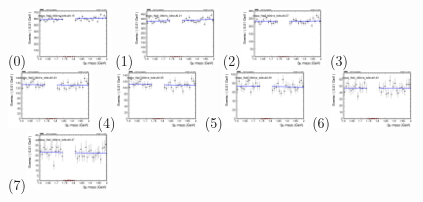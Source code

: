 \begin{figure}[h!]
        \centering
        \subfigure(0){\includegraphics[width=0.2\textwidth]{unfixed_exp/plots/all/massfit_all_40bins_bdtcut0.15.png}}
        \subfigure(1){\includegraphics[width=0.2\textwidth]{unfixed_exp/plots/all/massfit_all_40bins_bdtcut0.21.png}}
        \subfigure(2){\includegraphics[width=0.2\textwidth]{unfixed_exp/plots/all/massfit_all_40bins_bdtcut0.27.png}}
        \subfigure(3){\includegraphics[width=0.2\textwidth]{unfixed_exp/plots/all/massfit_all_40bins_bdtcut0.33.png}}
        \subfigure(4){\includegraphics[width=0.2\textwidth]{unfixed_exp/plots/all/massfit_all_40bins_bdtcut0.35.png}}
        \subfigure(5){\includegraphics[width=0.2\textwidth]{unfixed_exp/plots/all/massfit_all_40bins_bdtcut0.39.png}}
        \subfigure(6){\includegraphics[width=0.2\textwidth]{unfixed_exp/plots/all/massfit_all_40bins_bdtcut0.43.png}}
        \subfigure(7){\includegraphics[width=0.2\textwidth]{unfixed_exp/plots/all/massfit_all_40bins_bdtcut0.47.png}}

\end{figure}
